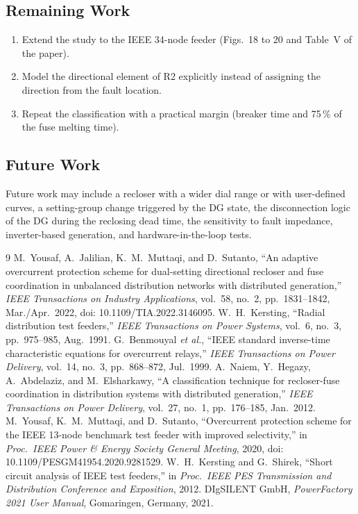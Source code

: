 \documentclass[12pt,letterpaper]{article}
\begin{document}
\subsection{Remaining Work}
\begin{enumerate}
\item Extend the study to the IEEE 34-node feeder (Figs.~18 to 20 and Table~V of the paper).
\item Model the directional element of R2 explicitly instead of assigning the direction from the fault location.
\item Repeat the classification with a practical margin (breaker time and 75\,\% of the fuse melting time).
\end{enumerate}

\subsection{Future Work}
Future work may include a recloser with a wider dial range or with user-defined curves, a setting-group
change triggered by the DG state, the disconnection logic of the DG during the reclosing dead time, the
sensitivity to fault impedance, inverter-based generation, and hardware-in-the-loop tests.

\clearpage
{}
\begin{thebibliography}{9}
 M.~Yousaf, A.~Jalilian, K.~M.~Muttaqi, and D.~Sutanto, ``An adaptive overcurrent
protection scheme for dual-setting directional recloser and fuse coordination in unbalanced distribution
networks with distributed generation,'' \textit{IEEE Transactions on Industry Applications}, vol.~58, no.~2,
pp.~1831--1842, Mar./Apr.\ 2022, doi: 10.1109/TIA.2022.3146095.
 W.~H.~Kersting, ``Radial distribution test feeders,'' \textit{IEEE Transactions on
Power Systems}, vol.~6, no.~3, pp.~975--985, Aug.\ 1991.
 G.~Benmouyal \textit{et al.}, ``IEEE standard inverse-time characteristic equations
for overcurrent relays,'' \textit{IEEE Transactions on Power Delivery}, vol.~14, no.~3, pp.~868--872,
Jul.\ 1999.
 A.~Naiem, Y.~Hegazy, A.~Abdelaziz, and M.~Elsharkawy, ``A classification technique for
recloser-fuse coordination in distribution systems with distributed generation,'' \textit{IEEE Transactions
on Power Delivery}, vol.~27, no.~1, pp.~176--185, Jan.\ 2012.
 M.~Yousaf, K.~M.~Muttaqi, and D.~Sutanto, ``Overcurrent protection scheme for the IEEE
13-node benchmark test feeder with improved selectivity,'' in \textit{Proc.\ IEEE Power \& Energy Society
General Meeting}, 2020, doi: 10.1109/PESGM41954.2020.9281529.
 W.~H.~Kersting and G.~Shirek, ``Short circuit analysis of IEEE test feeders,'' in
\textit{Proc.\ IEEE PES Transmission and Distribution Conference and Exposition}, 2012.
 DIgSILENT GmbH, \textit{PowerFactory 2021 User Manual}, Gomaringen, Germany, 2021.
\end{thebibliography}
\end{document}
